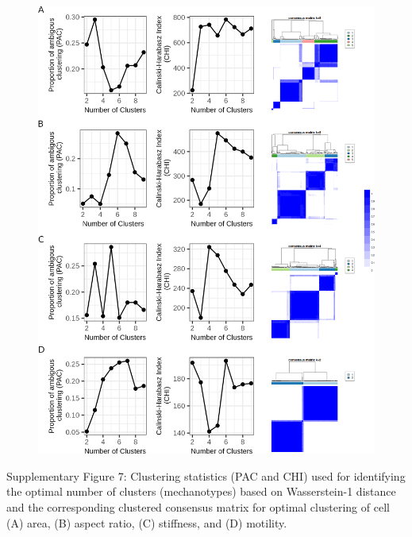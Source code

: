 \documentclass[11pt,letterpaper,english,oneside]{article} %
\begin{document}
\begin{figure}[H]
    \hspace*{-1.25cm}
    \centering
    \includegraphics[scale=0.341]{../Figures/Supplementary_Figure7/supplementary_figure7.png} 
    \caption{}
    \label{fig:fig7}
\end{figure}
\begin{adjustwidth}{1cm}{1cm}
    Supplementary Figure 7: Clustering statistics (PAC and CHI) used for identifying the optimal number of clusters (mechanotypes) based on Wasserstein-1 distance and the corresponding clustered consensus matrix for optimal clustering
    of cell (A) area, (B) aspect ratio, (C) stiffness, and (D) motility. 
\end{adjustwidth}
\end{document}
